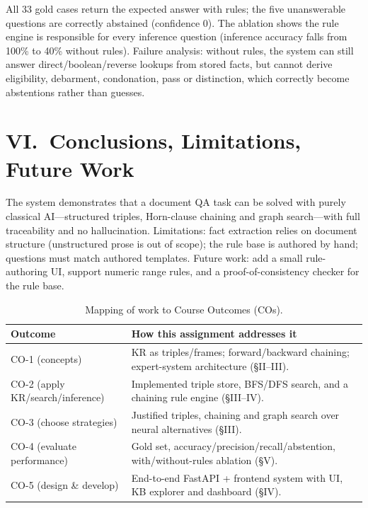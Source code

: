 \documentclass[10pt,twocolumn]{article}
\begin{document}
All 33 gold cases return the expected answer with rules; the five unanswerable
questions are correctly abstained (confidence 0). The ablation shows the
rule engine is responsible for every inference question (inference accuracy
falls from 100\% to 40\% without rules). Failure analysis: without rules, the
system can still answer direct/boolean/reverse lookups from stored facts, but
cannot derive eligibility, debarment, condonation, pass or distinction, which
correctly become abstentions rather than guesses.

\section*{VI.~Conclusions, Limitations, Future Work}
The system demonstrates that a document QA task can be solved with purely
classical AI---structured triples, Horn-clause chaining and graph search---with
full traceability and no hallucination. Limitations: fact extraction relies on
document structure (unstructured prose is out of scope); the rule base is
authored by hand; questions must match authored templates. Future work: add a
small rule-authoring UI, support numeric range rules, and a proof-of-consistency
checker for the rule base.

\begin{table}[h]
\centering\small
\caption{Mapping of work to Course Outcomes (COs).}
\label{tab:co}
\begin{tabular}{lp{7.6cm}}
\toprule
\textbf{Outcome} & \textbf{How this assignment addresses it} \\
\midrule
CO-1 (concepts) & KR as triples/frames; forward/backward chaining; expert-system architecture (\S II--III). \\
CO-2 (apply KR/search/inference) & Implemented triple store, BFS/DFS search, and a chaining rule engine (\S III--IV). \\
CO-3 (choose strategies) & Justified triples, chaining and graph search over neural alternatives (\S III). \\
CO-4 (evaluate performance) & Gold set, accuracy/precision/recall/abstention, with/without-rules ablation (\S V). \\
CO-5 (design \& develop) & End-to-end FastAPI + frontend system with UI, KB explorer and dashboard (\S IV). \\
\bottomrule
\end{tabular}
\end{table}
\end{document}

